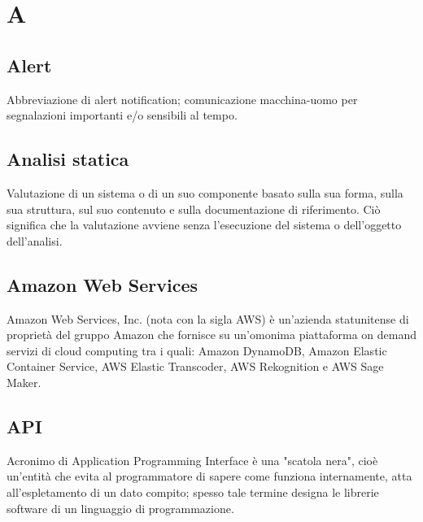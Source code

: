 \section*{A}
\subsection*{Alert}
Abbreviazione di alert notification; comunicazione macchina-uomo per segnalazioni importanti e/o sensibili al tempo.

\subsection*{Analisi statica}
Valutazione di un sistema o di un suo componente basato sulla sua forma, sulla sua struttura, sul suo contenuto e sulla documentazione di riferimento. Ciò significa che la valutazione avviene senza l'esecuzione del sistema o dell'oggetto dell'analisi.

\subsection*{Amazon Web Services}
Amazon Web Services, Inc. (nota con la sigla AWS) è un'azienda statunitense di proprietà del gruppo Amazon che fornisce su un'omonima piattaforma on demand servizi di cloud computing tra i quali: Amazon DynamoDB, Amazon Elastic Container Service, AWS Elastic Transcoder, AWS Rekognition e AWS Sage Maker.

\subsection*{API}
Acronimo di Application Programming Interface è una "scatola nera", cioè un'entità che evita al programmatore di sapere come funziona internamente, atta all'espletamento di un dato compito; spesso tale termine designa le librerie software di un linguaggio di programmazione.



